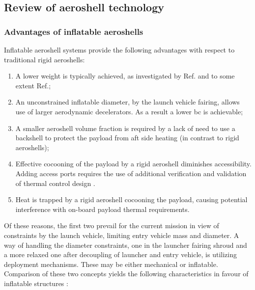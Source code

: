 \subsection{Review of aeroshell technology}\label{sec:aeroshells}

\subsubsection{Advantages of inflatable aeroshells}
Inflatable aeroshell systems provide the following advantages with respect to traditional rigid aeroshells: \cite{cassapakis, IRVEoverview} 
\begin{enumerate}
\item A lower weight is typically achieved, as investigated by Ref.\cite{Cruz} and to some extent Ref.\cite{EDLASphase1};
\item An unconstrained inflatable diameter, by the launch vehicle fairing, allows use of larger aerodynamic decelerators. As a result a lower \gls{bc} is achievable;
\item A smaller aeroshell volume fraction is required by a lack of need to use a backshell to protect the payload from aft side heating (in contrast to rigid aeroshells);
\item Effective cocooning of the payload by a rigid aeroshell diminishes accessibility. Adding access ports requires the use of additional verification and validation of thermal control design \cite{johnsonstardust}.
\item Heat is trapped by a rigid aeroshell cocooning the payload, causing potential interference with on-board payload thermal requirements.
\end{enumerate}
Of these reasons, the first two prevail for the current mission in view of constraints by the launch vehicle, limiting entry vehicle mass and diameter. A way of handling the diameter constraints, one in the launcher fairing shroud and a more relaxed one after decoupling of launcher and entry vehicle, is utilizing deployment mechanisms. These may be either mechanical or inflatable. Comparison of these two concepts yields the following characteristics in favour of inflatable structures \cite{cassapakis}:
